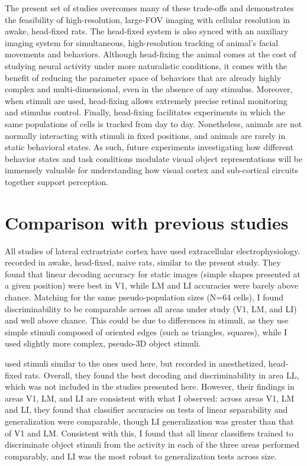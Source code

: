 The present set of studies overcomes many of these trade-offs and demonstrates the feasibility of high-resolution, large-FOV imaging with cellular resolution in awake, head-fixed rats. The head-fixed system is also synced with an auxiliary imaging system for simultaneous, high-resolution tracking of animal’s facial movements and behaviors. Although head-fixing the animal comes at the cost of studying neural activity under more naturalistic conditions, it comes with the benefit of reducing the parameter space of behaviors that are already highly complex and multi-dimensional, even in the absence of any stimulus\cite{Stringer2019spontaneous}. Moreover, when stimuli are used, head-fixing allows extremely precise retinal monitoring and stimulus control. Finally, head-fixing facilitates experiments in which the same populations of cells is tracked from day to day. Nonetheless, animals are not normally interacting with stimuli in fixed positions, and animals are rarely in static behavioral states. As such, future experiments investigating how different behavior states and task conditions modulate visual object representations will be immensely valuable for understanding how visual cortex and sub-cortical circuits together support perception.

\section{Comparison with previous studies}
All studies of lateral extrastriate cortex have used extracellular electrophysiology.
\citet{Vermaercke2014} recorded in awake, head-fixed, naive rats, similar to the present study. They found that linear decoding accuracy for static images (simple shapes presented at a given position) were best in V1, while LM and LI accuracies were barely above chance. Matching for the same pseudo-population sizes (N=64 cells), I found discriminability to be comparable across all areas under study (V1, LM, and LI) and well above chance. This could be due to differences in stimuli, as they use simple stimuli composed of oriented edges (such as triangles, squares), while I used slightly more complex, pseudo-3D object stimuli. 

\citet{Tafazoli2017} used stimuli similar to the ones used here, but recorded in anesthetized, head-fixed rats. Overall, they found the best decoding and discriminability in area LL, which was not included in the studies presented here. However, their findings in areas V1, LM, and LI are consistent with what I observed:  across areas V1, LM and LI, they found that classifier accuracies on tests of linear separability and generalization were comparable, though LI generalization was greater than that of V1 and LM. Consistent with this, I found that all linear classifiers trained to discriminate object stimuli from the activity in each of the three areas performed comparably, and LI was the most robust to generalization tests across size.

